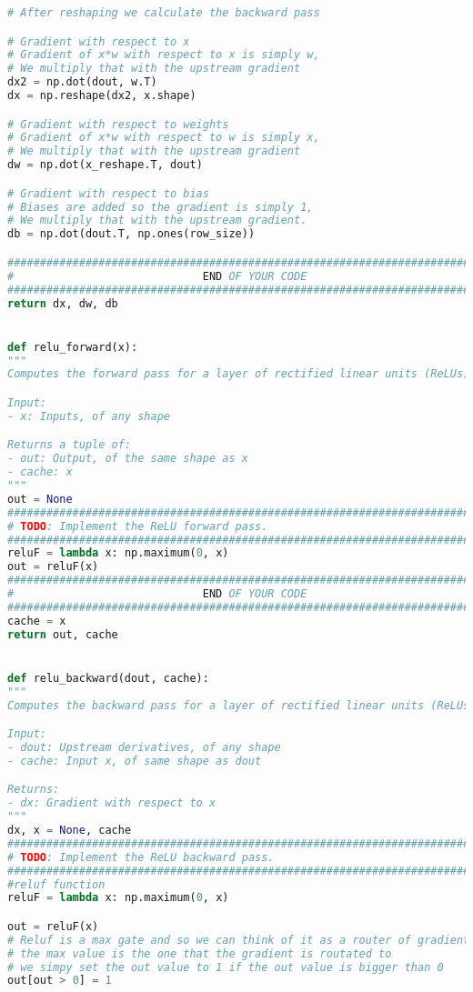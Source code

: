 \begin{lstlisting}[language=Python, label=lst:layers.py, caption={layers.py}, basicstyle=\tiny]
# After reshaping we calculate the backward pass

# Gradient with respect to x
# Gradient of x*w with respect to x is simply w, 
# We multiply that with the upstream gradient
dx2 = np.dot(dout, w.T) 
dx = np.reshape(dx2, x.shape)

# Gradient with respect to weights
# Gradient of x*w with respect to w is simply x,
# We multiply that with the upstream gradient
dw = np.dot(x_reshape.T, dout)

# Gradient with respect to bias
# Biases are added so the gradient is simply 1,
# We multiply that with the upstream gradient.
db = np.dot(dout.T, np.ones(row_size))

#############################################################################
#                             END OF YOUR CODE                              #
#############################################################################
return dx, dw, db


def relu_forward(x):
"""
Computes the forward pass for a layer of rectified linear units (ReLUs).

Input:
- x: Inputs, of any shape

Returns a tuple of:
- out: Output, of the same shape as x
- cache: x
"""
out = None
#############################################################################
# TODO: Implement the ReLU forward pass.                                    #
#############################################################################
reluF = lambda x: np.maximum(0, x)
out = reluF(x)
#############################################################################
#                             END OF YOUR CODE                              #
#############################################################################
cache = x
return out, cache


def relu_backward(dout, cache):
"""
Computes the backward pass for a layer of rectified linear units (ReLUs).

Input:
- dout: Upstream derivatives, of any shape
- cache: Input x, of same shape as dout

Returns:
- dx: Gradient with respect to x
"""
dx, x = None, cache
#############################################################################
# TODO: Implement the ReLU backward pass.                                   #
#############################################################################
#reluf function
reluF = lambda x: np.maximum(0, x)

out = reluF(x)
# Reluf is a max gate and so we can think of it as a router of gradients
# the max value is the one that the gradient is routated to
# we simpy set the out value to 1 if the out value is bigger than 0
out[out > 0] = 1


\end{lstlisting}
